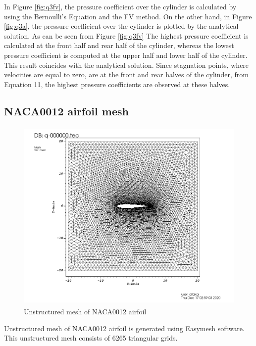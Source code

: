 \documentclass[letterpaper,12pt]{article}
\begin{document}
\newpage
In Figure \ref{fig:q3fv}, the pressure coefficient over the cylinder is calculated by using the 
Bernoulli's Equation and the FV method. On the other hand, in Figure \ref{fig:q3a}, the pressure coefficient
over the cylinder is plotted by the analytical solution. As can be seen from Figure \ref{fig:q3fv} 
The highest pressure coefficient is calculated at the front half and rear half of the cylinder, whereas
the lowest pressure coefficient is computed at the upper half and lower half of the cylinder. This result
coincides with the analytical solution. Since stagnation points, where velocities are equal to zero, 
are at the front and rear halves of the cylinder, from Equation 11, the highest pressure
coefficients are observed at these halves.

\subsection{NACA0012 airfoil mesh}
\label{sec:medium}

\begin{figure} [!h]
	\centering
	\includegraphics[height = 9.5cm]{graph/medium/medium_62650000.png}
	\caption{Unstructured mesh of NACA0012 airfoil}
    \label{fig:airfoilmesh}
\end{figure}

\vspace{1cm}

Unstructured mesh of NACA0012 airfoil is generated using Easymesh software. This
unstructured mesh consists of 6265 triangular grids.

\newpage
\end{document}
